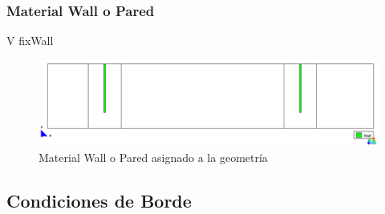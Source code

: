 \documentclass[spanish]{beamer}
\begin{document}
\subsubsection{Material Wall o Pared}
\begin{frame}
V fixWall
\begin{center}
\begin{figure}[tbhp]
\centerline{\includegraphics[scale=0.25]{../img/100m/100_condiciones_vfixwall_xz}}
\caption{Material Wall o Pared asignado a la geometría}
\label{100_condiciones_vfixwall_xz}
\end{figure}
\end{center}
\end{frame}
\subsection{Condiciones de Borde}
\end{document}
